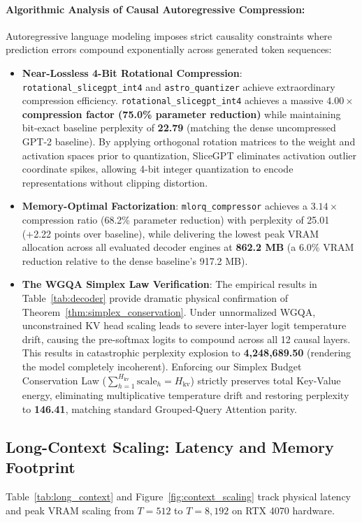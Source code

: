 \documentclass{article}
\begin{document}
\paragraph{Algorithmic Analysis of Causal Autoregressive Compression:}
Autoregressive language modeling imposes strict causality constraints where prediction errors compound exponentially across generated token sequences:
\begin{itemize}
    \item \textbf{Near-Lossless 4-Bit Rotational Compression}: \texttt{rotational\_slicegpt\_int4} and \texttt{astro\_quantizer} achieve extraordinary compression efficiency. \texttt{rotational\_slicegpt\_int4} achieves a massive \textbf{$4.00\times$ compression factor (75.0\% parameter reduction)} while maintaining bit-exact baseline perplexity of \textbf{22.79} (matching the dense uncompressed GPT-2 baseline). By applying orthogonal rotation matrices to the weight and activation spaces prior to quantization, SliceGPT eliminates activation outlier coordinate spikes, allowing 4-bit integer quantization to encode representations without clipping distortion.
    \item \textbf{Memory-Optimal Factorization}: \texttt{mlorq\_compressor} achieves a $3.14\times$ compression ratio (68.2\% parameter reduction) with perplexity of 25.01 (+2.22 points over baseline), while delivering the lowest peak VRAM allocation across all evaluated decoder engines at \textbf{862.2 MB} (a 6.0\% VRAM reduction relative to the dense baseline's 917.2 MB).
    \item \textbf{The WGQA Simplex Law Verification}: The empirical results in Table~\ref{tab:decoder} provide dramatic physical confirmation of Theorem~\ref{thm:simplex_conservation}. Under unnormalized WGQA, unconstrained KV head scaling leads to severe inter-layer logit temperature drift, causing the pre-softmax logits to compound across all 12 causal layers. This results in catastrophic perplexity explosion to \textbf{4,248,689.50} (rendering the model completely incoherent). Enforcing our Simplex Budget Conservation Law ($\sum_{h=1}^{H_{\text{kv}}} \text{scale}_h = H_{\text{kv}}$) strictly preserves total Key-Value energy, eliminating multiplicative temperature drift and restoring perplexity to \textbf{146.41}, matching standard Grouped-Query Attention parity.
\end{itemize}

\subsection{Long-Context Scaling: Latency and Memory Footprint}
Table~\ref{tab:long_context} and Figure~\ref{fig:context_scaling} track physical latency and peak VRAM scaling from $T=512$ to $T=8,192$ on RTX 4070 hardware.
\end{document}
